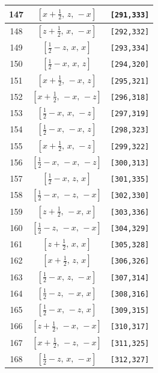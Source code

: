 \documentclass[fleqn,8pt]{jsarticle}
\begin{document}
\begin{longtable}{ccc}
147 & $\left[ x + \frac{1}{2},\, z,\, - x \right]$ & {\tt [291,333]} \\ \hline
148 & $\left[ z + \frac{1}{2},\, x,\, - x \right]$ & {\tt [292,332]} \\ \hline
149 & $\left[ \frac{1}{2} - z,\, x,\, x \right]$ & {\tt [293,334]} \\ \hline
150 & $\left[ \frac{1}{2} - x,\, x,\, z \right]$ & {\tt [294,320]} \\ \hline
151 & $\left[ x + \frac{1}{2},\, - x,\, z \right]$ & {\tt [295,321]} \\ \hline
152 & $\left[ x + \frac{1}{2},\, - x,\, - z \right]$ & {\tt [296,318]} \\ \hline
153 & $\left[ \frac{1}{2} - x,\, x,\, - z \right]$ & {\tt [297,319]} \\ \hline
154 & $\left[ \frac{1}{2} - x,\, - x,\, z \right]$ & {\tt [298,323]} \\ \hline
155 & $\left[ x + \frac{1}{2},\, x,\, - z \right]$ & {\tt [299,322]} \\ \hline
156 & $\left[ \frac{1}{2} - x,\, - x,\, - z \right]$ & {\tt [300,313]} \\ \hline
157 & $\left[ \frac{1}{2} - x,\, z,\, x \right]$ & {\tt [301,335]} \\ \hline
158 & $\left[ \frac{1}{2} - x,\, - z,\, - x \right]$ & {\tt [302,330]} \\ \hline
159 & $\left[ z + \frac{1}{2},\, - x,\, x \right]$ & {\tt [303,336]} \\ \hline
160 & $\left[ \frac{1}{2} - z,\, - x,\, - x \right]$ & {\tt [304,329]} \\ \hline
161 & $\left[ z + \frac{1}{2},\, x,\, x \right]$ & {\tt [305,328]} \\ \hline
162 & $\left[ x + \frac{1}{2},\, z,\, x \right]$ & {\tt [306,326]} \\ \hline
163 & $\left[ \frac{1}{2} - x,\, z,\, - x \right]$ & {\tt [307,314]} \\ \hline
164 & $\left[ \frac{1}{2} - z,\, - x,\, x \right]$ & {\tt [308,316]} \\ \hline
165 & $\left[ \frac{1}{2} - x,\, - z,\, x \right]$ & {\tt [309,315]} \\ \hline
166 & $\left[ z + \frac{1}{2},\, - x,\, - x \right]$ & {\tt [310,317]} \\ \hline
167 & $\left[ x + \frac{1}{2},\, - z,\, - x \right]$ & {\tt [311,325]} \\ \hline
168 & $\left[ \frac{1}{2} - z,\, x,\, - x \right]$ & {\tt [312,327]} \\ \hline

\end{longtable}
\end{document}
